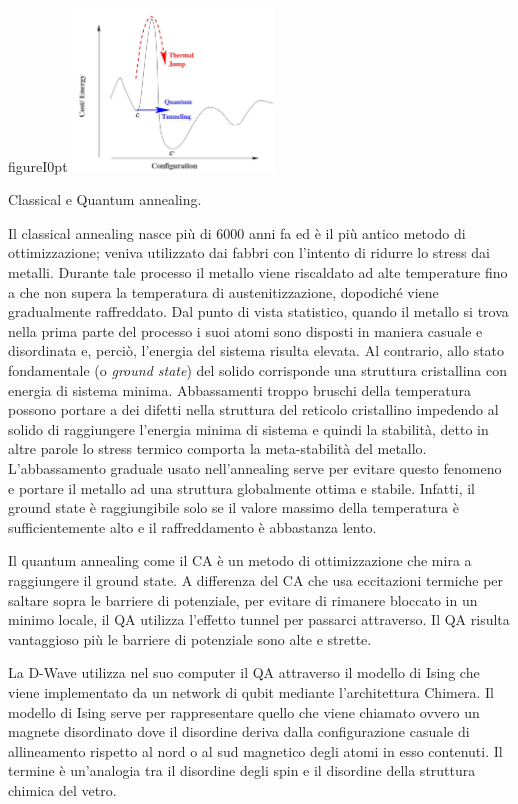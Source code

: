 \begin{wrapfloat}{figure}{I}{0pt}
\includegraphics[width=0.4\textwidth]{Immagini/qa.jpg}
\caption{Classical e Quantum annealing.}
\label{figura:qa}
\end{wrapfloat}
\cite{QA,QVC,ST}Il classical annealing  nasce più di 6000 anni fa ed è il più antico metodo di ottimizzazione; veniva utilizzato dai fabbri con l'intento di ridurre lo stress dai metalli. Durante tale processo il metallo viene riscaldato ad alte temperature fino a che non supera la temperatura di austenitizzazione, dopodiché viene gradualmente raffreddato.
Dal punto di vista statistico, quando il metallo si trova nella prima parte del processo i suoi atomi sono disposti in maniera casuale e disordinata e, perciò, l’energia del sistema risulta elevata. Al contrario, allo stato fondamentale (o \textit{ground state}) del solido corrisponde una struttura cristallina con energia di sistema minima.
Abbassamenti troppo bruschi della temperatura possono portare a dei difetti nella struttura del reticolo cristallino impedendo al solido di raggiungere l’energia minima di sistema e quindi la stabilità, detto in altre parole lo stress termico comporta la meta-stabilità del metallo. L’abbassamento graduale usato nell’annealing serve per evitare questo fenomeno e portare il metallo ad una struttura globalmente ottima e stabile. Infatti, il ground state è raggiungibile solo se il valore massimo della temperatura è sufficientemente alto e il raffreddamento è abbastanza lento.

\cite{QVC,QAS}Il quantum annealing come il CA è un metodo di ottimizzazione che mira a raggiungere il ground state. A differenza del CA che usa eccitazioni termiche per saltare sopra le barriere di potenziale, per evitare di rimanere bloccato in un minimo locale, il QA utilizza l'effetto tunnel per passarci attraverso. Il QA risulta vantaggioso più le barriere di potenziale sono alte e strette.

La D-Wave utilizza nel suo computer il QA attraverso il modello di Ising che viene implementato da un network di qubit mediante l'architettura Chimera. Il modello di Ising serve per rappresentare quello che viene chiamato  ovvero un magnete disordinato dove il disordine deriva dalla configurazione casuale di allineamento rispetto al nord o al sud magnetico degli atomi in esso contenuti. Il termine  è un'analogia tra il disordine degli spin e il disordine della struttura chimica del vetro.

